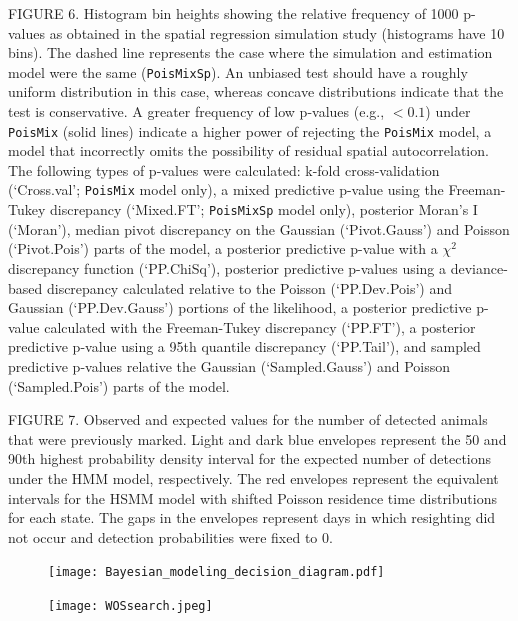 \documentclass[12pt,english]{article}
\begin{document}
\begin{spacing}{1.9}
FIGURE 6.  Histogram bin heights showing the relative frequency of
1000 p-values as obtained in the spatial regression simulation study
(histograms have 10 bins).  The dashed line represents the case where
the simulation and estimation model were the same
(\texttt{PoisMixSp}).  An unbiased test should have a roughly uniform
distribution in this case, whereas concave distributions indicate that
the test is conservative.  A greater frequency of low p-values (e.g.,
$<0.1$) under \texttt{PoisMix} (solid lines) indicate a higher power
of rejecting the \texttt{PoisMix} model, a model that incorrectly
omits the possibility of residual spatial autocorrelation.  The
following types of p-values were calculated: k-fold cross-validation
(`Cross.val'; \texttt{PoisMix} model only), a mixed predictive p-value
using the Freeman-Tukey discrepancy (`Mixed.FT'; \texttt{PoisMixSp}
model only), posterior Moran's I (`Moran'), median pivot discrepancy
on the Gaussian (`Pivot.Gauss') and Poisson (`Pivot.Pois') parts of
the model, a posterior predictive p-value with a $\chi^2$ discrepancy
function (`PP.ChiSq'), posterior predictive p-values using a
deviance-based discrepancy calculated relative to the Poisson
(`PP.Dev.Pois') and Gaussian (`PP.Dev.Gauss') portions of the
likelihood, a posterior predictive p-value calculated with the
Freeman-Tukey discrepancy (`PP.FT'), a posterior predictive p-value
using a 95th quantile discrepancy (`PP.Tail'), and sampled predictive
p-values relative the Gaussian (`Sampled.Gauss') and Poisson
(`Sampled.Pois') parts of the model.

FIGURE 7. Observed and expected values for the number of detected
animals that were previously marked. Light and dark blue envelopes
represent the 50 and 90th highest probability density interval for the
expected number of detections under the HMM model, respectively. The
red envelopes represent the equivalent intervals for the HSMM model
with shifted Poisson residence time distributions for each state. The
gaps in the envelopes represent days in which resighting did not occur
and detection probabilities were fixed to 0.


\pagebreak

\begin{figure}
  \begin{center}
    \texttt{[image: Bayesian\_modeling\_decision\_diagram.pdf]}
    \caption{} \label{fig:decision}
  \end{center}
\end{figure}

\begin{figure}
  \begin{center}
    \texttt{[image: WOSsearch.jpeg]}
    \caption{} \label{fig:WOS}
  \end{center}
\end{figure}


\end{spacing}
\end{document}
